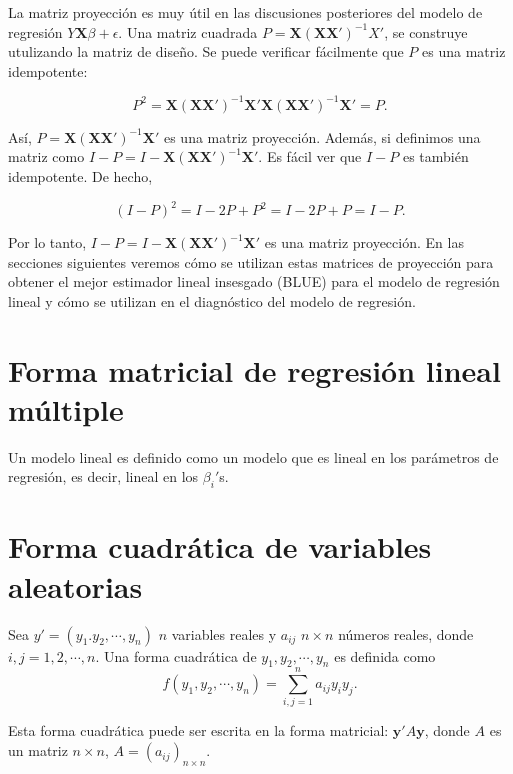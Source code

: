 La matriz proyección es muy útil en las discusiones posteriores del modelo de regresión $Y\textbf{X}\beta+\epsilon$. Una matriz cuadrada $P=\textbf{X}(\textbf{X}\textbf{X}')^{-1}X'$, se construye utulizando la matriz de diseño. Se puede verificar fácilmente que $P$ es una matriz idempotente:

$$P^2=\textbf{X}(\textbf{X}\textbf{X}')^{-1}\textbf{X}'\textbf{X}(\textbf{X}\textbf{X}')^{-1}\textbf{X}'=P.$$

Así, $P=\textbf{X}(\textbf{X}\textbf{X}')^{-1}\textbf{X}'$ es una matriz proyección. Además, si definimos una matriz como $I-P=I-\textbf{X}(\textbf{X}\textbf{X}')^{-1}\textbf{X}'$. Es fácil ver que $I-P$ es también idempotente. De hecho,

$$(I-P)^2=I-2P+P^2=I-2P+P=I-P.$$

Por lo tanto, $I-P=I-\textbf{X}(\textbf{X}\textbf{X}')^{-1}\textbf{X}'$ es una matriz proyección. En las secciones siguientes veremos cómo se utilizan estas matrices de proyección para obtener el mejor estimador lineal insesgado (BLUE) para el modelo de regresión lineal y cómo se utilizan en el diagnóstico del modelo de regresión.


\section{Forma matricial de regresión lineal múltiple}

\begin{def.}
    Un modelo lineal es definido como un modelo que es lineal en los parámetros de regresión, es decir, lineal en los $\beta_i'$s.
\end{def.}


\section{Forma cuadrática de variables aleatorias}

\begin{def.}
    Sea $y'=(y_1.y_2,\cdots,y_n)$ $n$ variables reales y $a_{ij}$ $n\times n$ números reales, donde $i,j=1,2,\cdots,n.$ Una forma cuadrática de $y_1,y_2,\cdots,y_n$ es definida como
    $$f(y_1,y_2,\cdots,y_n)=\sum_{i,j=1}^n a_{ij}y_iy_j.$$
\end{def.}

Esta forma cuadrática puede ser escrita en la forma matricial: $\textbf{y}'A\textbf{y}$, donde $A$ es un matriz $n\times n$, $A=(a_{ij})_{n\times n}$.\\

